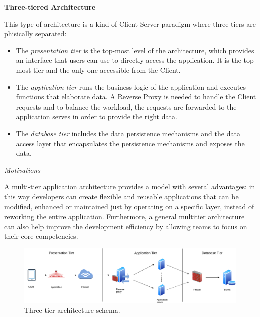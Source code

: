 \documentclass{report}
\begin{document}
\begin{center}\large{\textbf{Three-tiered Architecture}}\end{center}
This type of architecture is a kind of Client-Server paradigm where three tiers are phisically separated:
\begin{itemize}
	\item The \textit{presentation tier} is the top-most level of the architecture, which provides an interface that users can use to directly access the application. 
	It is the top-most tier and the only one accessible from the Client.
	\item The \textit{application tier} runs the business logic of the application and executes functions that elaborate data. 
	A Reverse Proxy is needed to handle the Client requests and to balance the workload, the requests are forwarded to 
	the application serves in order to provide the right data.
	\item The \textit{database tier} includes the data persistence mechanisms and the data access layer that encapsulates 
	the persistence mechanisms and exposes the data.
\end{itemize}
\begin{center}\large{\textit{Motivations}}\end{center}
A multi-tier application architecture provides a model with several advantages: in this way developers can create flexible and reusable 
applications that can be modified, enhanced or maintained just by operating on a specific layer, instead of reworking the entire application. Furthermore, a general multitier architecture can also help improve the development efficiency by allowing teams to focus on their core competencies.

\begin{figure}[!ht]
	\begin{center}
	\includegraphics[width=\textwidth]{img/TiersArchitecture.png}
	\end{center}
	\caption{Three-tier architecture schema.}
\end{figure}
\end{document}
